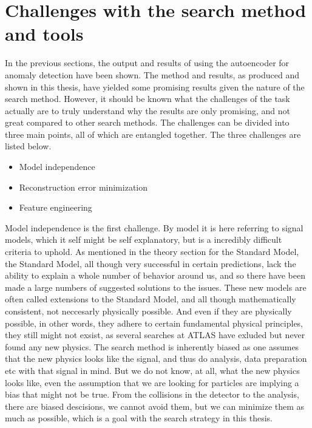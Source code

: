 \section{Challenges with the search method and tools}

In the previous sections, the output and results of using the autoencoder for anomaly detection have been shown. 
The method and results, as produced and shown in this thesis, have yielded some promising results given the nature 
of the search method. However, it should be known what the challenges of the task actually are to truly understand 
why the results are only promising, and not great compared to other search methods. The challenges can be divided into 
three main points, all of which are entangled together. The three challenges are listed below. 

\begin{itemize}
    \item Model independence
    \item Reconstruction error minimization
    \item Feature engineering
\end{itemize}

Model independence is the first challenge. By model it is here referring to signal models, which it self might be self 
explanatory, but is a incredibly difficult criteria to uphold. As mentioned in the theory section for the Standard Model, 
the Standard Model, all though very successful in certain predictions, lack the ability to explain a whole number of 
behavior around us, and so there have been made a large numbers of suggested solutions to the issues. These new models are 
often called extensions to the Standard Model, and all though mathematically consistent, not neccesarly physically possible. 
And even if they are physically possible, in other words, they adhere to certain fundamental physical principles, they 
still might not exsist, as several searches at ATLAS have exluded but never found any new physics. The search method is inherently 
biased as one assumes that the new physics looks like the signal, and thus do analysis, data preparation etc with that 
signal in mind. But we do not know, at all, what the new physics looks like, even the assumption that we are looking for 
particles are implying a bias that might not be true. From the collisions in the detector to the analysis, there are biased descisions, 
we cannot avoid them, but we can minimize them as much as possible, which is a goal with the search strategy in this thesis. \par

